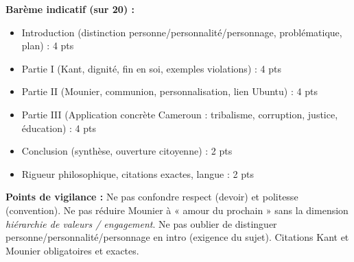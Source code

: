 \documentclass[11pt]{article}
\begin{document}
\begin{corrige}
\textbf{Barème indicatif (sur 20) :}
\begin{itemize}
\item Introduction (distinction personne/personnalité/personnage, problématique, plan) : 4 pts
\item Partie I (Kant, dignité, fin en soi, exemples violations) : 4 pts
\item Partie II (Mounier, communion, personnalisation, lien Ubuntu) : 4 pts
\item Partie III (Application concrète Cameroun : tribalisme, corruption, justice, éducation) : 4 pts
\item Conclusion (synthèse, ouverture citoyenne) : 2 pts
\item Rigueur philosophique, citations exactes, langue : 2 pts
\end{itemize}
\textbf{Points de vigilance :} Ne pas confondre respect (devoir) et politesse (convention). Ne pas réduire Mounier à « amour du prochain » sans la dimension \emph{hiérarchie de valeurs / engagement}. Ne pas oublier de distinguer personne/personnalité/personnage en intro (exigence du sujet). Citations Kant et Mounier obligatoires et exactes.
\end{corrige}
\end{document}

